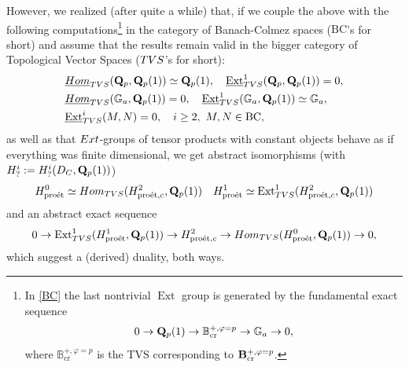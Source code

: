 \documentclass[10pt,reqno]{amsart}
\theoremstyle{definition}
\theoremstyle{remark}
\def\phi{\varphi}
\newcommand{\proeet}{\operatorname{pro\acute{e}t} }
\newcommand{\uHom}{\underline{{\rm{Hom}} }}
\newcommand{\Ext}{\operatorname{Ext} }
\newcommand{\crr}{\operatorname{cr} }
\numberwithin{equation}{section}
\def\Q{{\bf Q}} \def\Z{{\bf Z}}
\def\TVS{TVS, VS, BC}
\numberwithin{equation}{section}
\begin{document}
However, we realized (after quite a while) that, if we couple the above with the following 
computations\footnote{In \eqref{BC}  
the last nontrivial $\Ext$ group is generated by the fundamental exact sequence
 $$0\to {\Q}_p(1)\to {\mathbb B}^{+,\phi=p}_{\crr}\to {\mathbb G}_a\to 0,$$
where ${\mathbb B}^{+,\phi=p}_{\crr}$ is the  {\rm TVS} corresponding to  ${\B}^{+,\phi=p}_{\crr}$.}
 in the category of \index{TVS@\TVS}Banach-Colmez spaces ($\mathrm{BC}$'s  for short) and 
 assume that the results remain valid
in the bigger category of Topological Vector Spaces (${\rm TVS}$'s for short):
 \begin{align}\label{BC}
&  \uHom_{\rm TVS}({\Q}_p,\Q_p(1))\simeq {\Q}_p(1),\quad \underline{\Ext}^1_{\rm TVS}({\Q}_p,{\Q}_p(1))=0,\\
&    \uHom_{\rm TVS}({\mathbb G}_a,{\Q}_p(1))=0,\quad \underline{\Ext}^1_{\rm TVS}({\mathbb G}_a,{\Q}_p(1))\simeq {\mathbb G}_a,\notag\\
&  \underline{\Ext}^i_{\rm TVS}(M,N)=0, \quad i\geq 2,\ M,N \in \mathrm{BC},\notag
 \end{align}
as well as that ${\rm Ext}$-groups of tensor products with constant objects behave as if
everything was finite dimensional, we get abstract isomorphisms
(with $H^i_{?}:=H^i_{?}(D_C,\Q_p(1))$)
\begin{equation}\label{dua1}
 H^0_{\proeet}\simeq {\rm Hom}_{\rm TVS}(H^2_{\proeet,c},{\Q}_p(1))
\quad
 H^1_{\proeet}\simeq \Ext^1_{\rm TVS}(H^2_{\proeet,c},{\Q}_p(1)) 
\end{equation}
and an abstract exact sequence
\begin{equation}\label{dua2}
0\to \Ext^1_{\rm TVS}(H^1_{\proeet},\Q_p(1))\to
H^2_{\proeet,c}\to {\rm Hom}_{\rm TVS}(H^0_{\proeet},\Q_p(1))\to 0,
\end{equation}
which suggest a (derived) duality, both ways.
  
\end{document}
